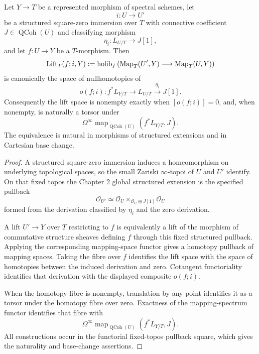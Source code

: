 \begin{lemma}
\label{lem:var-fixed-extension-lifting}
Let \(Y\to T\) be a represented morphism of spectral schemes, let
\[
    i:U\longrightarrow U'
\]
be a structured square-zero immersion over \(T\) with connective coefficient \(J\in\operatorname{QCoh}(U)\) and classifying morphism
\[
    \eta_i:L_{U/T}\longrightarrow J[1],
\]
and let \(f:U\to Y\) be a \(T\)-morphism.  Then
\[
    \operatorname{Lift}_T(f;i,Y)
    :=
    \operatorname{hofib}_f\left(
      \operatorname{Map}_T(U',Y)
      \longrightarrow
      \operatorname{Map}_T(U,Y)
    \right)
\]
is canonically the space of nullhomotopies of
\[
    \boxed{
    o(f;i):
    f^*L_{Y/T}
    \longrightarrow
    L_{U/T}
    \xrightarrow{\eta_i}
    J[1].
    }
\]
Consequently the lift space is nonempty exactly when \([o(f;i)]=0\), and, when nonempty, is naturally a torsor under
\[
    \boxed{
    \Omega^\infty
    \operatorname{map}_{\operatorname{QCoh}(U)}
    (f^*L_{Y/T},J).
    }
\]
The equivalence is natural in morphisms of structured extensions and in Cartesian base change.
\end{lemma}

\begin{proof}
A structured square-zero immersion induces a homeomorphism on underlying topological spaces, so the small Zariski \(\infty\)-topoi of \(U\) and \(U'\) identify.  On that fixed topos the Chapter 2 global structured extension is the specified pullback
\[
    \mathcal O_{U'}
    \simeq
    \mathcal O_U
    \times_{\mathcal O_U\oplus J[1]}
    \mathcal O_U
\]
formed from the derivation classified by \(\eta_i\) and the zero derivation.

A lift \(U'\to Y\) over \(T\) restricting to \(f\) is equivalently a lift of the morphism of commutative structure sheaves defining \(f\) through this fixed structured pullback.  Applying the corresponding mapping-space functor gives a homotopy pullback of mapping spaces.  Taking the fibre over \(f\) identifies the lift space with the space of homotopies between the induced derivation and zero.  Cotangent functoriality identifies that derivation with the displayed composite \(o(f;i)\).

When the homotopy fibre is nonempty, translation by any point identifies it as a torsor under the homotopy fibre over zero.  Exactness of the mapping-spectrum functor identifies that fibre with
\[
    \Omega^\infty
    \operatorname{map}_{\operatorname{QCoh}(U)}(f^*L_{Y/T},J).
\]
All constructions occur in the functorial fixed-topos pullback square, which gives the naturality and base-change assertions.
\end{proof}


